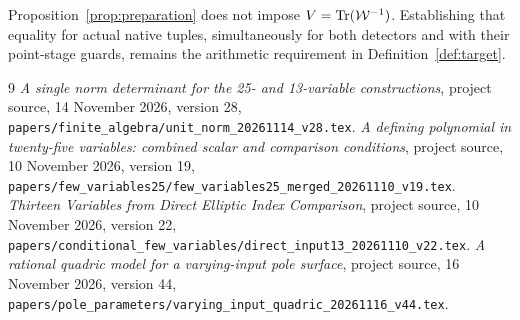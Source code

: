 \documentclass[11pt,a4paper]{article}
\theoremstyle{definition}\newtheorem{definition}[theorem]{Definition}
\begin{document}
Proposition~\ref{prop:preparation} does not impose
$V=\operatorname{Tr}(\mathcal W^{-1})$. Establishing that equality for actual
native tuples, simultaneously for both detectors and with their
point-stage guards, remains the arithmetic requirement in
Definition~\ref{def:target}.

\begin{thebibliography}{9}
\emph{A single norm determinant for the 25- and 13-variable constructions},
project source, 14 November 2026, version 28,
\nolinkurl{papers/finite_algebra/unit_norm_20261114_v28.tex}.
\emph{A defining polynomial in twenty-five variables: combined scalar
and comparison conditions}, project source, 10 November 2026, version 19,
\nolinkurl{papers/few_variables25/few_variables25_merged_20261110_v19.tex}.
\emph{Thirteen Variables from Direct Elliptic Index Comparison}, project source,
10 November 2026, version 22,
\nolinkurl{papers/conditional_few_variables/direct_input13_20261110_v22.tex}.
\emph{A rational quadric model for a varying-input pole surface}, project source,
16 November 2026, version 44,
\nolinkurl{papers/pole_parameters/varying_input_quadric_20261116_v44.tex}.
\end{thebibliography}
\end{document}
